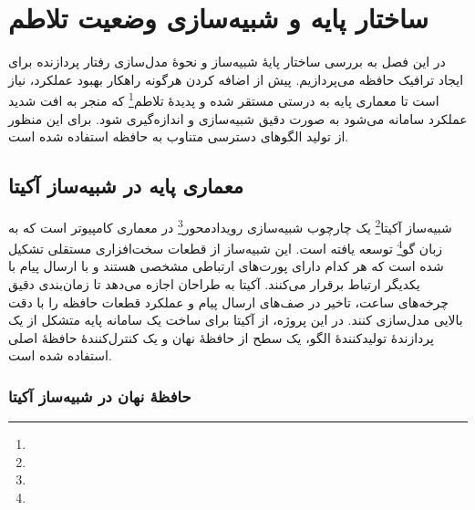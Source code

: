 \chapter{ساختار پایه و شبیه‌سازی وضعیت تلاطم}

در این فصل به بررسی ساختار پایهٔ شبیه‌ساز و نحوهٔ مدل‌سازی رفتار پردازنده برای ایجاد ترافیک حافظه می‌پردازیم. پیش از اضافه کردن هرگونه راهکار بهبود عملکرد، نیاز است تا معماری پایه به درستی مستقر شده و پدیدهٔ تلاطم\footnote{} که منجر به افت شدید عملکرد سامانه می‌شود به صورت دقیق شبیه‌سازی و اندازه‌گیری شود. برای این منظور از تولید الگوهای دسترسی متناوب به حافظه استفاده شده است.

\section{معماری پایه در شبیه‌ساز آکیتا}

شبیه‌ساز آکیتا\footnote{} یک چارچوب شبیه‌سازی رویدادمحور\footnote{} در معماری کامپیوتر است که به زبان گو\footnote{} توسعه یافته است. این شبیه‌ساز از قطعات سخت‌افزاری مستقلی تشکیل شده است که هر کدام دارای پورت‌های ارتباطی مشخصی هستند و با ارسال پیام با یکدیگر ارتباط برقرار می‌کنند. آکیتا به طراحان اجازه می‌دهد تا زمان‌بندی دقیق چرخه‌های ساعت، تاخیر در صف‌های ارسال پیام و عملکرد قطعات حافظه را با دقت بالایی مدل‌سازی کنند. در این پروژه، از آکیتا برای ساخت یک سامانه پایه متشکل از یک پردازندهٔ تولیدکنندهٔ الگو، یک سطح از حافظهٔ نهان و یک کنترل‌کنندهٔ حافظهٔ اصلی استفاده شده است.\cite{akita}

\subsection{حافظهٔ نهان در شبیه‌ساز آکیتا}

